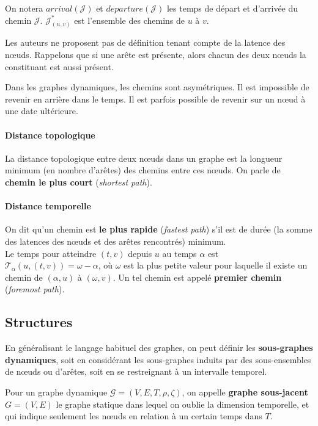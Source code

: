 \documentclass[12pt,a4paper]{article}
\begin{document}
On notera \(arrival(\mathcal{J})\) et \(departure(\mathcal{J})\) les
temps de départ et d'arrivée du chemin
\(\mathcal{J}\). \(\mathcal{J}_{(u, v)}^*\) est l'ensemble des chemins
de \(u\) à \(v\).

Les auteurs ne proposent pas de définition tenant compte de la latence
des nœuds. Rappelons que si une arête est présente, alors chacun des
deux nœuds la constituant est aussi présent.

Dans les graphes dynamiques, les chemins sont asymétriques. Il est
impossible de revenir en arrière dans le temps. Il est parfois
possible de revenir sur un nœud à une date ultérieure.

\paragraph{Distance topologique} La distance topologique entre deux
nœuds dans un graphe est la longueur minimum (en nombre d'arêtes) des
chemins entre ces nœuds. On parle de \textbf{chemin le plus court}
(\textit{shortest path}).

\paragraph{Distance temporelle}
On dit qu'un chemin est \textbf{le plus rapide} (\textit{fastest
  path}) s'il est de durée (la somme des latences des nœuds et des
arêtes rencontrés) minimum.\\
Le temps pour atteindre \((t, v)\) depuis \(u\) au temps \(\alpha\)
est \(\mathcal{T}_{\alpha}(u, (t, v)) = \omega - \alpha\), où
\(\omega\) est la plus petite valeur pour laquelle il existe un chemin
de \((\alpha, u)\) à \((\omega, v)\). Un tel chemin est appelé
\textbf{premier chemin} (\textit{foremost path}).

\subsection{Structures}

En généralisant le langage habituel des graphes, on peut définir les
\textbf{sous-graphes dynamiques}, soit en considérant les sous-graphes
induits par des sous-ensembles de nœuds ou d'arêtes, soit en se
restreignant à un intervalle temporel.

Pour un graphe dynamique \(\mathcal{G} = (V, E, T, \rho, \zeta)\), on
appelle \textbf{graphe sous-jacent} \(G = (V, E)\) le graphe statique
dans lequel on oublie la dimension temporelle, et qui indique
seulement les nœuds en relation à un certain temps dans \(T\).
\end{document}
